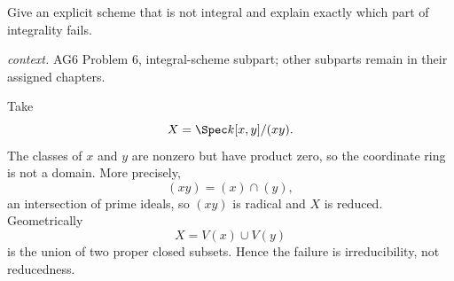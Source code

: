 \begin{problem}\label{prob:vi27-p02}
Give an explicit scheme that is not integral and explain exactly which part of integrality fails.
\par\smallskip\noindent\textit{context.} AG6 Problem 6, integral-scheme subpart; other subparts remain in their assigned chapters.
\end{problem}

\ifdefined\FullProblemDossiers
\begin{solution}
Take
\[
X=\Spec k[x,y]/(xy).
\]
The classes of \(x\) and \(y\) are nonzero but have product zero, so the coordinate ring is not a domain. More
precisely,
\[
(xy)=(x)\cap(y),
\]
an intersection of prime ideals, so \((xy)\) is radical and \(X\) is reduced. Geometrically
\[
X=V(x)\cup V(y)
\]
is the union of two proper closed subsets. Hence the failure is irreducibility, not reducedness.
\end{solution}
\fi
